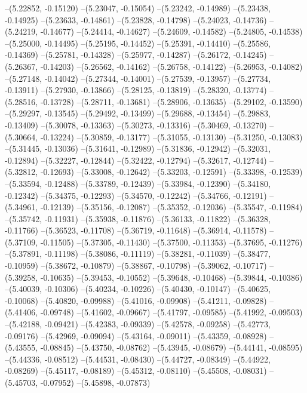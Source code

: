 --(5.22852, -0.15120)
--(5.23047, -0.15054)
--(5.23242, -0.14989)
--(5.23438, -0.14925)
--(5.23633, -0.14861)
--(5.23828, -0.14798)
--(5.24023, -0.14736)
--(5.24219, -0.14677)
--(5.24414, -0.14627)
--(5.24609, -0.14582)
--(5.24805, -0.14538)
--(5.25000, -0.14495)
--(5.25195, -0.14452)
--(5.25391, -0.14410)
--(5.25586, -0.14369)
--(5.25781, -0.14328)
--(5.25977, -0.14287)
--(5.26172, -0.14245)
--(5.26367, -0.14203)
--(5.26562, -0.14162)
--(5.26758, -0.14122)
--(5.26953, -0.14082)
--(5.27148, -0.14042)
--(5.27344, -0.14001)
--(5.27539, -0.13957)
--(5.27734, -0.13911)
--(5.27930, -0.13866)
--(5.28125, -0.13819)
--(5.28320, -0.13774)
--(5.28516, -0.13728)
--(5.28711, -0.13681)
--(5.28906, -0.13635)
--(5.29102, -0.13590)
--(5.29297, -0.13545)
--(5.29492, -0.13499)
--(5.29688, -0.13454)
--(5.29883, -0.13409)
--(5.30078, -0.13363)
--(5.30273, -0.13316)
--(5.30469, -0.13270)
--(5.30664, -0.13224)
--(5.30859, -0.13177)
--(5.31055, -0.13130)
--(5.31250, -0.13083)
--(5.31445, -0.13036)
--(5.31641, -0.12989)
--(5.31836, -0.12942)
--(5.32031, -0.12894)
--(5.32227, -0.12844)
--(5.32422, -0.12794)
--(5.32617, -0.12744)
--(5.32812, -0.12693)
--(5.33008, -0.12642)
--(5.33203, -0.12591)
--(5.33398, -0.12539)
--(5.33594, -0.12488)
--(5.33789, -0.12439)
--(5.33984, -0.12390)
--(5.34180, -0.12342)
--(5.34375, -0.12293)
--(5.34570, -0.12242)
--(5.34766, -0.12191)
--(5.34961, -0.12139)
--(5.35156, -0.12087)
--(5.35352, -0.12036)
--(5.35547, -0.11984)
--(5.35742, -0.11931)
--(5.35938, -0.11876)
--(5.36133, -0.11822)
--(5.36328, -0.11766)
--(5.36523, -0.11708)
--(5.36719, -0.11648)
--(5.36914, -0.11578)
--(5.37109, -0.11505)
--(5.37305, -0.11430)
--(5.37500, -0.11353)
--(5.37695, -0.11276)
--(5.37891, -0.11198)
--(5.38086, -0.11119)
--(5.38281, -0.11039)
--(5.38477, -0.10959)
--(5.38672, -0.10879)
--(5.38867, -0.10798)
--(5.39062, -0.10717)
--(5.39258, -0.10635)
--(5.39453, -0.10552)
--(5.39648, -0.10468)
--(5.39844, -0.10386)
--(5.40039, -0.10306)
--(5.40234, -0.10226)
--(5.40430, -0.10147)
--(5.40625, -0.10068)
--(5.40820, -0.09988)
--(5.41016, -0.09908)
--(5.41211, -0.09828)
--(5.41406, -0.09748)
--(5.41602, -0.09667)
--(5.41797, -0.09585)
--(5.41992, -0.09503)
--(5.42188, -0.09421)
--(5.42383, -0.09339)
--(5.42578, -0.09258)
--(5.42773, -0.09176)
--(5.42969, -0.09094)
--(5.43164, -0.09011)
--(5.43359, -0.08928)
--(5.43555, -0.08845)
--(5.43750, -0.08762)
--(5.43945, -0.08679)
--(5.44141, -0.08595)
--(5.44336, -0.08512)
--(5.44531, -0.08430)
--(5.44727, -0.08349)
--(5.44922, -0.08269)
--(5.45117, -0.08189)
--(5.45312, -0.08110)
--(5.45508, -0.08031)
--(5.45703, -0.07952)
--(5.45898, -0.07873)
